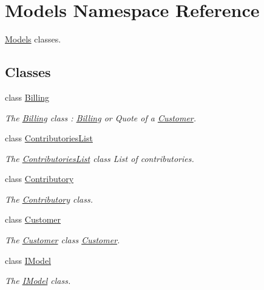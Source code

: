 \hypertarget{namespaceModels}{\section{Models Namespace Reference}
\label{namespaceModels}
}


\hyperlink{namespaceModels}{Models} classes.  


\subsection*{Classes}
\begin{DoxyCompactItemize}
\item 
class \hyperlink{classModels_1_1Billing}{Billing}
\begin{DoxyCompactList}\small\item\em The \hyperlink{classModels_1_1Billing}{Billing} class \-: \hyperlink{classModels_1_1Billing}{Billing} or Quote of a \hyperlink{classModels_1_1Customer}{Customer}. \end{DoxyCompactList}\item 
class \hyperlink{classModels_1_1ContributoriesList}{Contributories\-List}
\begin{DoxyCompactList}\small\item\em The \hyperlink{classModels_1_1ContributoriesList}{Contributories\-List} class List of contributories. \end{DoxyCompactList}\item 
class \hyperlink{classModels_1_1Contributory}{Contributory}
\begin{DoxyCompactList}\small\item\em The \hyperlink{classModels_1_1Contributory}{Contributory} class. \end{DoxyCompactList}\item 
class \hyperlink{classModels_1_1Customer}{Customer}
\begin{DoxyCompactList}\small\item\em The \hyperlink{classModels_1_1Customer}{Customer} class \hyperlink{classModels_1_1Customer}{Customer}. \end{DoxyCompactList}\item 
class \hyperlink{classModels_1_1IModel}{I\-Model}
\begin{DoxyCompactList}\small\item\em The \hyperlink{classModels_1_1IModel}{I\-Model} class. \end{DoxyCompactList}\item 

\end{DoxyCompactItemize}
